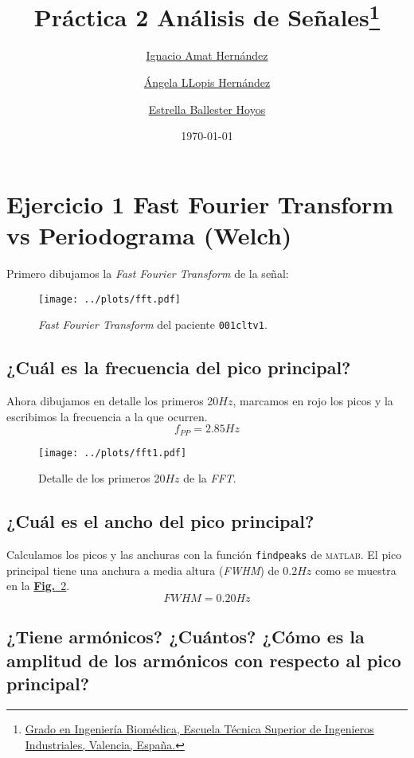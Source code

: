 \documentclass{article}
\title{\textbf{Práctica 2 Análisis de Señales}\thanks{\href{https://www.upv.es/titulaciones/GIB/indexc.html}{Grado en Ingeniería Biomédica, Escuela Técnica Superior de Ingenieros Industriales, Valencia, España.}}}
\date{\today}
\author{
     \href{mailto:igamher@etsid.upv.es}{Ignacio Amat Hernández}
\and \href{mailto:ngellohe@etsii.upv.es}{Ángela LLopis Hernández}
\and \href{mailto:esbalho@etsii.upv.es}{Estrella Ballester Hoyos}
}
\begin{document}
\maketitle
\section{Ejercicio 1 Fast Fourier Transform vs Periodograma (Welch)}

Primero dibujamos la \textit{Fast Fourier Transform} de la señal:
\vfill
\begin{figure}[h]
\centering
\texttt{[image: ../plots/fft.pdf]}
\vspace{-1.5cm}
\caption{\textit{Fast Fourier Transform} del paciente \lstinline[style=matlab-editor]{001cltv1}.}
\label{fig:fft}
\end{figure}
\vfill
\newpage

\subsection{¿Cuál es la frecuencia del pico principal?}
Ahora dibujamos en detalle los primeros 20$Hz$, marcamos en rojo los
picos y la escribimos la frecuencia a la que ocurren.
\begin{equation}
f_{PP} = 2.85 Hz
\end{equation}
\vspace{-1cm}
\begin{figure}[h]
\centering
\texttt{[image: ../plots/fft1.pdf]}
\vspace{-1.5cm}
\caption{Detalle de los primeros 20$Hz$ de la \textit{FFT}.}
\label{fig:picos}
\end{figure}

\vspace{-1cm}
\subsection{¿Cuál es el ancho del pico principal?}

Calculamos los picos y las anchuras con la función
\lstinline[style=matlab-editor]{findpeaks} de
\textsc{matlab}.
El pico principal tiene una anchura a media altura (\textit{FWHM}) de
$0.2Hz$ como se muestra en la \hyperref[fig:picos]{\textbf{Fig.}~\ref*{fig:picos}}.
\begin{equation}
FWHM = 0.20 Hz
\end{equation}
\vspace{-1.5cm}
\subsection{¿Tiene  armónicos?  ¿Cuántos? ¿Cómo es la amplitud  de
los armónicos con respecto al pico principal?}
\end{document}
